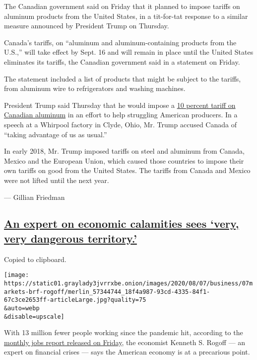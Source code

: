 The Canadian government said on Friday that it planned to impose tariffs
on aluminum products from the United States, in a tit-for-tat response
to a similar measure announced by President Trump on Thursday.

Canada's tariffs, on ``aluminum and aluminum-containing products from
the U.S.,'' will take effect by Sept. 16 and will remain in place until
the United States eliminates its tariffs, the Canadian government said
in a statement on Friday.

The statement included a list of products that might be subject to the
tariffs, from aluminum wire to refrigerators and washing machines.

President Trump said Thursday that he would impose a
\href{https://www.nytimes3xbfgragh.onion/2020/08/06/business/economy/trump-canadian-aluminum-tariffs.html}{10
percent tariff on Canadian aluminum} in an effort to help struggling
American producers. In a speech at a Whirpool factory in Clyde, Ohio,
Mr. Trump accused Canada of ``taking advantage of us as usual.''

In early 2018, Mr. Trump imposed tariffs on steel and aluminum from
Canada, Mexico and the European Union, which caused those countries to
impose their own tariffs on good from the United States. The tariffs
from Canada and Mexico were not lifted until the next year.

--- Gillian Friedman

\hypertarget{an-expert-on-economic-calamities-sees-very-very-dangerous-territory}{%
\subsection{\texorpdfstring{\protect\hyperlink{an-expert-on-economic-calamities-sees-very-very-dangerous-territory}{An
expert on economic calamities sees `very, very dangerous
territory.'}}{An expert on economic calamities sees `very, very dangerous territory.'}}\label{an-expert-on-economic-calamities-sees-very-very-dangerous-territory}}

Copied to clipboard.

\texttt{[image: https://static01.graylady3jvrrxbe.onion/images/2020/08/07/business/07markets-brf-rogoff/merlin\_57344744\_18f4a987-93cd-4335-84f1-67c3ce2653ff-articleLarge.jpg?quality=75\\\&auto=webp\\\&disable=upscale]}

With 13 million fewer people working since the pandemic hit, according
to the \href{https://www.bls.gov/news.release/empsit.nr0.htm}{monthly
jobs report released on Friday}, the economist Kenneth S. Rogoff --- an
expert on financial crises --- says the American economy is at a
precarious point.

